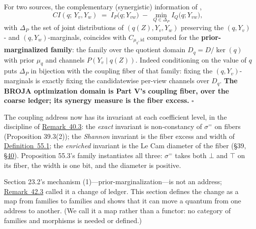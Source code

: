 \begin{thmplain}

For two sources, the complementary (synergistic) information of \autocite{bertschinger2014b},
\[
CI(q;\, Y_v, Y_w) \;=\; I_P\big(q; Y_{vw}\big) \;-\; \min_{Q \in \Delta_P} I_Q\big(q; Y_{vw}\big),
\]
with \(\Delta_P\) the set of joint distributions of \((q(Z), Y_v, Y_w)\) preserving the \((q, Y_v)\)- and \((q, Y_w)\)-marginals, coincides with \(C_{\mu_q, \mathrm{id}}\) computed for the \textbf{prior-marginalized family}: the family over the quotient domain \(D_q = D / \ker(q)\) with prior \(\mu_q\) and channels \(P(Y_v \mid q(Z))\). Indeed conditioning on the value of \(q\) puts \(\Delta_P\) in bijection with the coupling fiber of that family: fixing the \((q, Y_v)\)-marginals is exactly fixing the candidatewise per-view channels over \(D_q\). \textbf{The BROJA optimization domain is Part V's coupling fiber, over the coarse ledger; its synergy measure is the fiber excess.} \(\square\)
\end{thmplain}

\begin{thmrem}

The coupling address now has its invariant at each coefficient level, in the discipline of \hyperlink{stmt:40.3}{Remark~40.3}: the \emph{exact} invariant is non-constancy of \(\sigma^{=}\) on fibers (Proposition 39.3(2)); the \emph{Shannon} invariant is the fiber excess and width of \hyperlink{stmt:55.1}{Definition~55.1}; the \emph{enriched} invariant is the Le Cam diameter of the fiber (§39, \hyperlink{sec:40}{§40}). Proposition 55.3's family instantiates all three: \(\sigma^{=}\) takes both \(\bot\) and \(\top\) on its fiber, the width is one bit, and the diameter is positive.
\end{thmrem}


Section 23.2's mechanism (1)---\hspace{0pt}prior-marginalization---\hspace{0pt}is not an address; \hyperlink{stmt:42.3}{Remark~42.3} called it a change of ledger. This section defines the change as a map from families to families and shows that it can move a quantum from one address to another. (We call it a map rather than a functor: no category of families and morphisms is needed or defined.)

